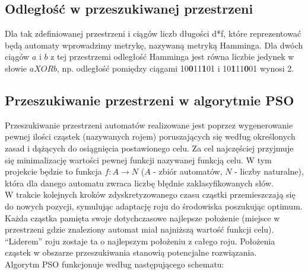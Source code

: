 \documentclass[runningheads,a4paper]{llncs}
\begin{document}
\subsection{Odległość w przeszukiwanej przestrzeni}

Dla tak zdefiniowanej przestrzeni i ciągów liczb długości d*f, które reprezentować będą automaty wprowadzimy metrykę, nazywaną metryką Hamminga. Dla dwóch ciągów $a$ i $b$ z tej przestrzemi odległość Hamminga jest równa liczbie jedynek w słowie $a XOR b$, np. odległość pomiędzy ciągami 10\textbf{0}11\textbf{1}01 i 10\textbf{1}11\textbf{0}01 wynosi 2.

\subsection{Przeszukiwanie przestrzeni w algorytmie PSO}

Przeszukiwanie przestrzeni automatów realizowane jest poprzez wygenerowanie pewnej ilości cząstek (nazywanych rojem) poruszających się według określonych zasad i dążących do osiągnięcia postawionego celu. Za cel najczęściej przyjmuje się minimalizację wartości pewnej funkcji nazywanej funkcją celu. W tym projekcie będzie to funkcja $f:A \rightarrow N$ ($A$ - zbiór automatów, $N$ - liczby naturalne), która dla danego automatu zwraca liczbę błędnie zaklasyfikowanych słów.\\

W trakcie kolejnych kroków zdyskretyzowanego czasu cząstki przemieszczają się do nowych pozycji, symulując adaptację roju do środowiska poszukując optimum. Każda cząstka pamięta swoje dotychczasowe najlepsze położenie (miejsce w przestrzeni gdzie znaleziony automat miał najniższą wartość funkcji celu). “Liderem” roju zostaje ta o najlepszym położeniu z całego roju. Położenia cząstek w obszarze przeszukiwania stanowią potencjalne rozwiązania. \\

Algorytm PSO funkcjonuje według następującego schematu:
\end{document}
